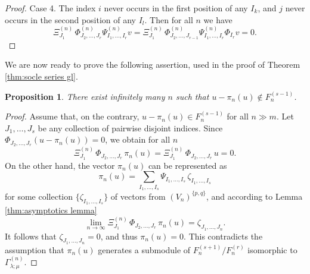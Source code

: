 \documentclass[12pt,reqno]{amsart}
\numberwithin{equation}{section}
\theoremstyle{plain}
\newtheorem{prop}[thm]{Proposition}
\theoremstyle{definition}
\begin{document}
\begin{proof}
Case 4. The index $i$ never occurs in the first position of any $I_k$, and $j$ never occurs in the second position of any $I_l$. Then for all $n$ we have
\begin{equation*}
    \Xi^{(n)}_{J_1} \, \Phi_{J_2,\dots,J_r}^{(n)}
    \Psi_{I_1,\dots,I_r}^{(n)} v =
    \Xi^{(n)}_{J_1} \, \Phi_{J_2,\dots,J_{r-1}}^{(n)}
    \Psi_{I_1,\dots,I_r}^{(n)} \Phi_{I_r} v = 0.
\end{equation*}

\end{proof}

We are now ready to prove the following assertion, used in the proof of Theorem \ref{thm:socle series gl}.
\begin{prop}\label{thm:proval}
There exist infinitely many $n$ such that $u - \pi_n(u) \notin F_n^{(s-1)}$.
\end{prop}
\begin{proof}
Assume that, on the contrary, $u - \pi_n(u) \in F_n^{(s-1)}$ for all $n\gg m$. Let $J_1,\dots,J_s$ be any collection of pairwise disjoint indices. Since $\Phi_{J_2,\dots,J_r} (u - \pi_n(u)) = 0$, we obtain for all $n$
\begin{equation*}
    \Xi^{(n)}_{J_1} \, \Phi_{J_2,\dots,J_r} \, \pi_n(u) =
    \Xi^{(n)}_{J_1} \, \Phi_{J_2,\dots,J_r} \, u = 0.
\end{equation*}
On the other hand, the vector $\pi_n(u)$ can be represented as
\begin{equation*}
    \pi_n(u) = \sum_{I_1,\dots,I_s} \Psi_{I_1,\dots,I_s} \, \zeta_{I_1,\dots,I_s}
\end{equation*}
for some collection $\{\zeta_{I_1,\dots,I_s} \}$ of vectors from $(V_n)^{\{p,q\}}$, and according to
Lemma \ref{thm:asymptotics lemma}
\begin{equation*}
    \lim_{n\to \infty} \Xi^{(n)}_{J_1} \, \Phi_{J_2,\dots,J_r} \, \pi_n(u) = \zeta_{J_1,\dots,J_n}.
\end{equation*}
It follows that $\zeta_{J_1,\dots,J_n} = 0$, and thus $\pi_n(u) = 0$. This contradicts the assumption that $\pi_n(u)$ generates a submodule of $F_n^{(s+1)}/F_n^{(r)}$ isomorphic to $\varGamma_{\lambda;\mu}^{(n)}$.
\end{proof}
\end{document}
